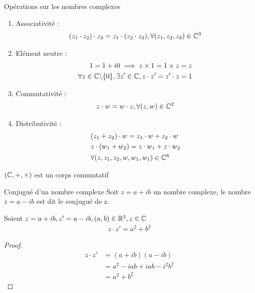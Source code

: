\begin{proposition}{Opérations sur les nombres complexes}
\begin{enumerate}
\begin{enumerate}
    \item Associativité :
    \begin{align*}
    (z_1 \cdot z_2) \cdot z_3 = z_1 \cdot (z_2 \cdot z_3), \forall (z_1, z_2, z_3) \in \mathbb{C}^3
    \end{align*}
    \item Elément neutre :
        \begin{align*}
        1 = 1 + i0 \implies z \times 1 = 1 \times z = z \\
        \forall z \in \mathbb{C} \backslash \{0\}, \exists z' \in \mathbb{C}, z \cdot z' = z' \cdot z =1
        \end{align*}
    \item Commutativité :
        \begin{align*}
        z \cdot w = w \cdot z, \forall (z, w) \in \mathbb{C}^2
        \end{align*}
    \item Distributivité :
        \begin{align*}
        &(z_1 + z_2) \cdot w = z_1 \cdot w + z_2 \cdot w \\
        &z \cdot (w_1 + w_2) = z \cdot w_1 + z \cdot w_2 \\
        &\forall (z, z_1, z_2, w, w_1, w_1) \in \mathbb{C}^6
        \end{align*}
\end{enumerate}

\end{enumerate}
\end{proposition}

\begin{remarque}
    $(\mathbb{C}, +, \times)$ est un corps commutatif 
\end{remarque}

\begin{definition}{Conjugué d'un nombre complexe}
    Soit $z = a + ib$ un nombre complexe, le nombre $\overline{z} = a - ib$ est dit le conjugué de z.
\end{definition}

\begin{proposition}{}
    Soient $z = a + ib, z'= a - ib, (a, b) \in \mathbb{R}^2, z \in \mathbb{C}$
    \begin{align*}
        z \cdot z' = a^2 + b^2
    \end{align*}
\end{proposition}
\begin{proof}
        \begin{align*}
            z \cdot z' &= (a + ib)(a - ib) \\
                        &= a^2 -iab + iab -i^2b^2 \\
                        &= a^2 + b^2
        \end{align*}
    \end{proof}


